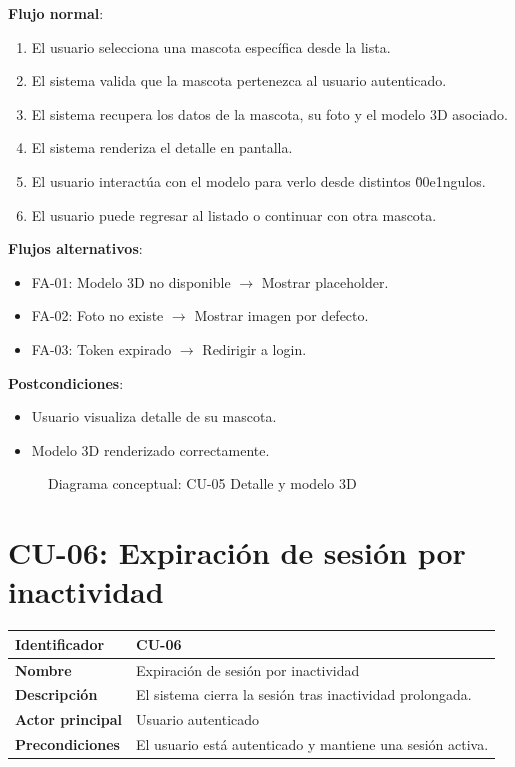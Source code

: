 \documentclass[12pt,a4paper]{article}
\begin{document}
\vspace{0.5em}

\textbf{Flujo normal}:
\begin{enumerate}[leftmargin=*]
    \item El usuario selecciona una mascota espec\'ifica desde la lista.
    \item El sistema valida que la mascota pertenezca al usuario autenticado.
    \item El sistema recupera los datos de la mascota, su foto y el modelo 3D asociado.
    \item El sistema renderiza el detalle en pantalla.
    \item El usuario interact\'ua con el modelo para verlo desde distintos \u00e1ngulos.
    \item El usuario puede regresar al listado o continuar con otra mascota.
\end{enumerate}

\textbf{Flujos alternativos}:
\begin{itemize}[leftmargin=*]
    \item FA-01: Modelo 3D no disponible $\rightarrow$ Mostrar placeholder.
    \item FA-02: Foto no existe $\rightarrow$ Mostrar imagen por defecto.
    \item FA-03: Token expirado $\rightarrow$ Redirigir a login.
\end{itemize}

\textbf{Postcondiciones}:
\begin{itemize}[leftmargin=*]
    \item Usuario visualiza detalle de su mascota.
    \item Modelo 3D renderizado correctamente.
\end{itemize}

\begin{figure}[h]
\centering
{}
\caption{Diagrama conceptual: CU-05 Detalle y modelo 3D}
\end{figure}

\newpage

\section{CU-06: Expiraci\'on de sesi\'on por inactividad}

\begin{tabular}{|p{3.5cm}|p{10cm}|}
\hline
\textbf{Identificador} & CU-06 \\
\hline
\textbf{Nombre} & Expiraci\'on de sesi\'on por inactividad \\
\hline
\textbf{Descripci\'on} & El sistema cierra la sesi\'on tras inactividad prolongada. \\
\hline
\textbf{Actor principal} & Usuario autenticado \\
\hline
\textbf{Precondiciones} & El usuario est\'a autenticado y mantiene una sesi\'on activa. \\
\hline
\end{tabular}
\end{document}
